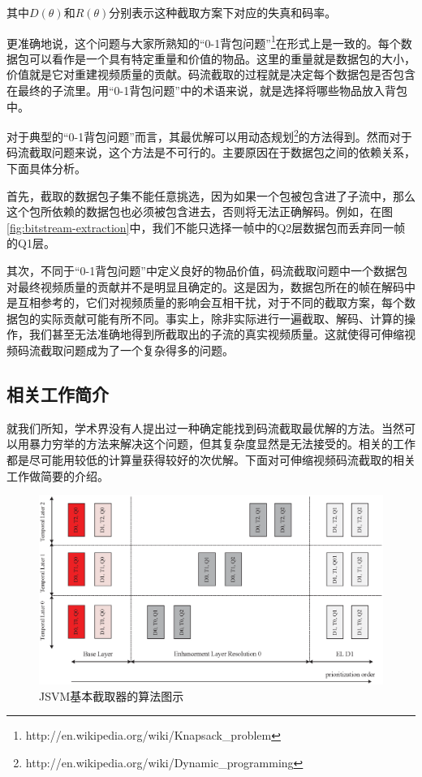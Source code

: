 其中$D(\theta)$和$R(\theta)$分别表示这种截取方案下对应的失真和码率。

更准确地说，这个问题与大家所熟知的“0-1背包问题”\footnote{http://en.wikipedia.org/wiki/Knapsack\_problem}在形式上是一致的。每个数据包可以看作是一个具有特定重量和价值的物品。这里的重量就是数据包的大小，价值就是它对重建视频质量的贡献。码流截取的过程就是决定每个数据包是否包含在最终的子流里。用“0-1背包问题”中的术语来说，就是选择将哪些物品放入背包中。

对于典型的“0-1背包问题”而言，其最优解可以用动态规划\footnote{http://en.wikipedia.org/wiki/Dynamic\_programming}的方法得到。然而对于码流截取问题来说，这个方法是不可行的。主要原因在于数据包之间的依赖关系，下面具体分析。

首先，截取的数据包子集不能任意挑选，因为如果一个包被包含进了子流中，那么这个包所依赖的数据包也必须被包含进去，否则将无法正确解码。例如，在图\ref{fig:bitstream-extraction}中，我们不能只选择一帧中的Q2层数据包而丢弃同一帧的Q1层。

其次，不同于“0-1背包问题”中定义良好的物品价值，码流截取问题中一个数据包对最终视频质量的贡献并不是明显且确定的。这是因为，数据包所在的帧在解码中是互相参考的，它们对视频质量的影响会互相干扰，对于不同的截取方案，每个数据包的实际贡献可能有所不同。事实上，除非实际进行一遍截取、解码、计算的操作，我们甚至无法准确地得到所截取出的子流的真实视频质量。这就使得可伸缩视频码流截取问题成为了一个复杂得多的问题。

\subsection{相关工作简介}

就我们所知，学术界没有人提出过一种确定能找到码流截取最优解的方法。当然可以用暴力穷举的方法来解决这个问题，但其复杂度显然是无法接受的。相关的工作都是尽可能用较低的计算量获得较好的次优解。下面对可伸缩视频码流截取的相关工作做简要的介绍。

\begin{figure}[h]
	\centering
	\vspace{10pt}
	\includegraphics[width = 1.0\linewidth]{eps/JSVM-basic}
	\caption{JSVM基本截取器的算法图示\label{fig:JSVM-basic}}
\end{figure}

